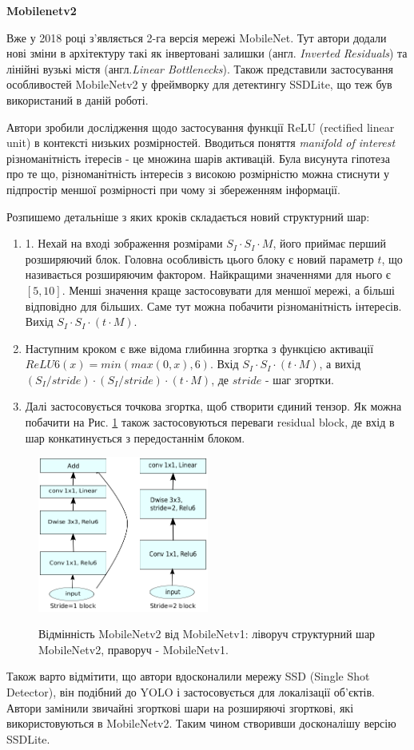 \textbf{Mobilenetv2}

Вже у 2018 році з'являється 2-га версія мережі MobileNet. Тут автори додали нові зміни в
архітектуру такі як інвертовані залишки (англ. \textit{Inverted Residuals}) та 
лінійні вузькі містя (англ.\textit{Linear Bottlenecks}). Також представили застосування 
особливостей MobileNetv2 у фреймворку для детектингу SSDLite, що теж був використаний
в даній роботі.

Автори зробили дослідження щодо застосування функції ReLU (rectified linear unit) в 
контексті низьких розмірностей. Вводиться поняття \textit{manifold of interest} 
різноманітність ітересів - це множина шарів активацій. Була висунута гіпотеза про те що,
різноманітність інтересів з високою розмірністю можна стиснути у підпростір меншої розмірності при
чому зі збереженням інформації.

Розпишемо детальніше з яких кроків складається новий структурний шар:


\begin{enumerate}
    \item   1. Нехай на вході зображення розмірами $S_I · S_I · M$, його приймає перший розширяючий блок.
            Головна особливість цього блоку є новий параметр $t$, що називається розширяючим фактором.
            Найкращими значеннями для нього є $[5,10]$. Менші значення краще застосовувати для меншої мережі,
            а більші відповідно для більших. Саме тут можна побачити різноманітність інтересів.
            Вихід $S_I · S_I · (t·M)$.
    \item   Наступним кроком є вже відома глибинна згортка з функцією активації $ReLU6(x) =  min(max(0,x),6)$.
            Вхід $S_I · S_I · (t·M)$, а вихід $(S_I/stride) · (S_I/stride) · (t·M)$, де  $stride$ - шаг згортки.
    \item   Далі застосовується точкова згортка, щоб створити єдиний тензор. Як можна побачити на 
            Рис. \ref{fig:cnn:mobilenetv2_layer} також застосовуються переваги residual block, де вхід в шар 
            конкатинується з передостаннім блоком.
\end{enumerate}


\begin{figure}[H]
    \centering
    \includegraphics[width=0.5\textwidth]{images/cnn_mobilenetv2_layer}  \cite{mobilenetv2}
    \caption{Відмінність MobileNetv2 від MobileNetv1: ліворуч структурний шар MobileNetv2,
            праворуч - MobileNetv1.
    \label{fig:cnn:mobilenetv2_layer}
    }
\end{figure}

Також варто відмітити, що автори вдосконалили мережу SSD (Single Shot Detector), він подібний 
до YOLO і застосовується для локалізації об'єктів. Автори замінили звичайні згорткові шари 
на розширяючі згорткові, які використовуються в MobileNetv2. Таким чином створивши досконалішу 
версію SSDLite.